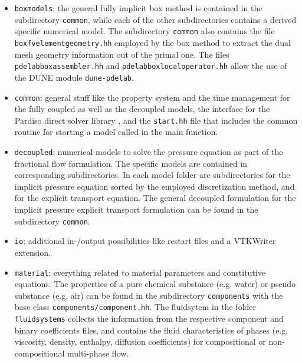 \begin{itemize} 

\item \texttt{boxmodels}:
the general fully implicit box method is contained in the subdirectory 
\texttt{common}, while each of the other subdirectories contains 
a derived specific numerical model. The subdirectory \texttt{common} also contains the file \texttt{boxfvelementgeometry.hh} employed by the box method to extract the dual mesh geometry information out of the primal one. The files \texttt{pdelabboxassembler.hh} and \texttt{pdelabboxlocaloperator.hh} allow the use of the DUNE module \texttt{dune-pdelab}. 

\item \texttt{common}:
general stuff like the property system and the time management for the 
fully coupled as well as the decoupled models, the interface for the Pardiso direct solver library \cite{Pardiso}, and the \texttt{start.hh} file that includes the common routine for starting a model called in the main function. 

\item \texttt{decoupled}:
 numerical models to solve the pressure equation as part of the fractional flow formulation. The specific models are contained 
 in corresponding subdirectories. In each model folder are subdirectories for the implicit pressure equation sorted by the employed discretization method, and for the explicit transport equation. The general decoupled formulation for the implicit pressure explicit transport formulation can be found in the subdirectory \texttt{common}.




\item \texttt{io}: additional in-/output possibilities like restart files 
and a VTKWriter extension. 

\item \texttt{material}: everything related to material parameters and 
constitutive equations. The properties of a pure chemical substance (e.g. water) or pseudo substance (e.g. air) can be found in the subdirectory \texttt{components} with the base class \texttt{components/component.hh}. The fluidsytem in the folder \texttt{fluidsystems} collects the information from the respective component and binary coefficients files, and contains the fluid characteristics of phases (e.g. viscosity, density, enthalpy, diffusion coefficients) for compositional or non-compositional multi-phase flow. 


\end{itemize}
